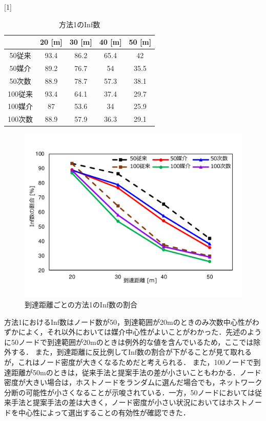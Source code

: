 \begin{table}[H]
\centering
  \caption{方法1のInf数}
\scalebox{1}[1]{
  \begin{tabular}{c|c|c|c|c} \hline\hline
 &20 [\si{\meter}] & 30 [\si{\meter}] & 40 [\si{\meter}] & 50 [\si{\meter}] \\ \hline
50従来 & 93.4 & 86.2 & 65.4 & 42 \\ 
50媒介 & 89.2 & 76.7 & 54 & 35.5 \\ 
50次数 & 88.9 & 78.7 & 57.3 & 38.1 \\ 
100従来 & 93.4 & 64.1 & 37.4 & 29.7 \\ 
100媒介 & 87 & 53.6 & 34 & 25.9 \\ 
100次数 & 88.9 & 57.9 & 36.3 & 29.1 \\ \hline\hline
  \end{tabular}
  }
  \label{tab:1_inf}
\end{table}







\begin{figure}[H]
  \centering
  \includegraphics[width=1.05\textwidth]{figures/1Inf.pdf}
  \caption{到達距離ごとの方法1のInf数の割合}
  \label{fig:1Infall}
\end{figure}
方法1におけるInf数はノード数が50，到達範囲が20\si{\meter}のときのみ次数中心性がわずかによく，それ以外においては媒介中心性がよいことがわかった．先述のように50ノードで到達範囲が20\si{\meter}のときは例外的な値を含んでいるため，ここでは除外する．
また，到達距離に反比例してInf数の割合が下がることが見て取れるが，これはノード密度が大きくなるためだと考えられる．
また，100ノードで到達距離が50\si{\meter}のときは，従来手法と提案手法の差が小さいこともわかる．ノード密度が大きい場合は，ホストノードをランダムに選んだ場合でも，ネットワーク分断の可能性が小さくなることが示唆されている．一方，50ノードにおいては従来手法と提案手法の差は大きく，ノード密度が小さい状況においてはホストノードを中心性によって選出することの有効性が確認できた．

